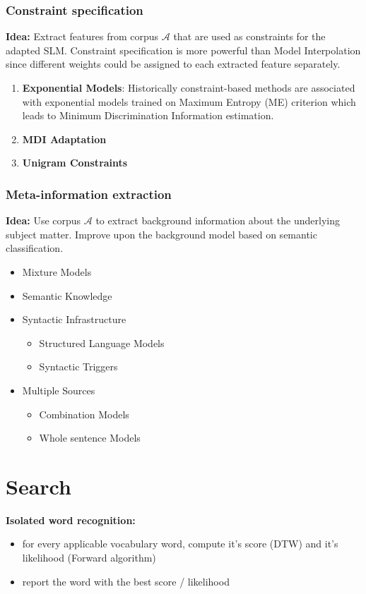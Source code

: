 \subsubsection{Constraint specification}
\textbf{Idea:} Extract features from corpus $\mathcal{A}$ that are used as constraints for the adapted SLM.
Constraint specification is more powerful than Model Interpolation since different weights could be assigned to each extracted feature separately.
\begin{enumerate}
\item \textbf{Exponential Models}: Historically constraint-based methods are associated with exponential models trained on Maximum Entropy (ME) criterion which leads to Minimum Discrimination Information estimation.
\item \textbf{MDI Adaptation}
\item \textbf{Unigram Constraints}
\end{enumerate}


\subsubsection{Meta-information extraction}
\textbf{Idea:} Use corpus $\mathcal{A}$ to extract background information about the underlying subject matter. Improve upon the background model based on semantic classification.
\begin{itemize}
\item Mixture Models
\item Semantic Knowledge
\item Syntactic Infrastructure
\begin{itemize}
\item Structured Language Models
\item Syntactic Triggers
\end{itemize}
\item Multiple Sources
\begin{itemize}
\item Combination Models
\item Whole sentence Models
\end{itemize}
\end{itemize}

\newpage

\section{Search}

\textbf{Isolated word recognition:}
\begin{itemize}
    \item for every applicable vocabulary word, compute it's score (DTW) and it's likelihood (Forward algorithm)
    \item report the word with the best score / likelihood
\end{itemize}

